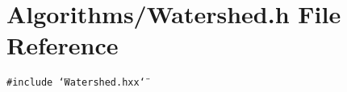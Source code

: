 \section{Algorithms/Watershed.h File Reference}
\label{Watershed_8h}
{\tt \#include \char`\"{}Watershed.hxx\char`\"{}}\par
